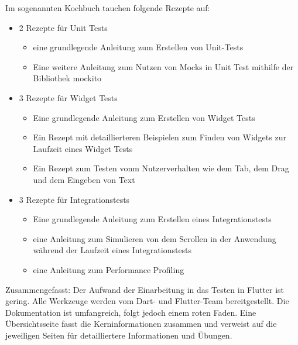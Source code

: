 Im sogenannten Kochbuch tauchen folgende Rezepte auf:

\begin{itemize}
    \item 2 Rezepte für Unit Tests
    \begin{itemize} 
       \item eine grundlegende Anleitung zum Erstellen von Unit-Tests 
       \item Eine weitere Anleitung zum Nutzen von Mocks in Unit Test mithilfe der Bibliothek mockito 
    \end{itemize}
    \item 3 Rezepte für Widget Tests
    \begin{itemize} 
        \item Eine grundlegende Anleitung zum Erstellen von Widget Tests 
        \item Ein Rezept mit detaillierteren Beispielen zum Finden von Widgets  zur Laufzeit eines Widget Tests 
        \item Ein Rezept zum Testen vonm Nutzerverhalten wie dem Tab, dem Drag und dem Eingeben von Text 
     \end{itemize}
    \item 3 Rezepte für Integrationstests
    \begin{itemize} 
        \item Eine grundlegende Anleitung zum Erstellen eines Integrationstests 
        \item eine Anleitung zum Simulieren von dem Scrollen in der Anwendung während der Laufzeit eines Integrationstests 
        \item eine Anleitung zum Performance Profiling 
     \end{itemize}
\end{itemize}

Zusammengefasst: Der Aufwand der Einarbeitung in das Testen in Flutter ist gering.
Alle Werkzeuge werden vom Dart- und Flutter-Team bereitgestellt.
Die Dokumentation ist umfangreich, folgt jedoch einem roten Faden.
Eine Übersichtsseite fasst die Kerninformationen zusammen und verweist auf die jeweiligen  Seiten für detailliertere Informationen und Übungen.
